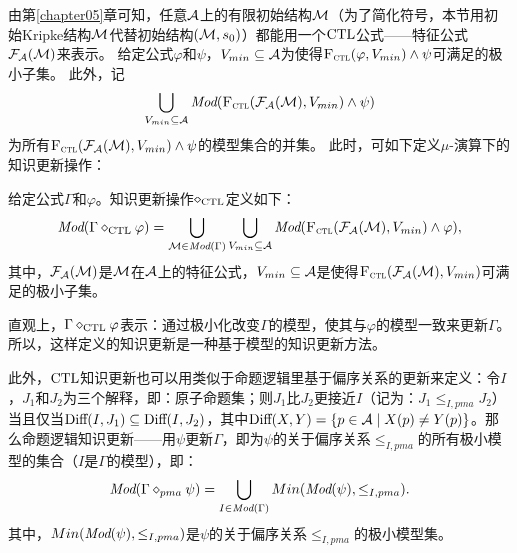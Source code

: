 由第\ref{chapter05}章可知，任意${\cal A}$上的有限初始结构${\cal M}$（为了简化符号，本节用初始Kripke结构${\cal M}$代替初始结构$({\cal M},s_0)$）都能用一个$\textrm{CTL}$公式——特征公式${\cal F}_{{\cal A}}({\cal M})$来表示。%
给定公式$\varphi$和$\psi$，$V_{min}\subseteq {\cal A}$为使得${\textsc{F}_{\textsc{ctl}}}(\varphi, V_{min}) \wedge \psi$可满足的极小子集。
此外，记
$$\bigcup_{V_{min}\subseteq {\cal A}} \textit{Mod}({\textsc{F}_{\textsc{ctl}}}({\cal F}_{{\cal A}}({\cal M}), V_{min}) \wedge \psi)$$ 
为所有${\textsc{F}_{\textsc{ctl}}}({\cal F}_{{\cal A}}({\cal M}), V_{min}) \wedge \psi$的模型集合的并集。
此时，可如下定义$\mu$-演算下的知识更新操作：


\begin{definition}\label{def:KU}
	给定公式$\Gamma$和$\varphi$。知识更新操作$\diamond_{\textrm{CTL}}$定义如下：
	\[
	\textit{Mod}(\Gamma \diamond_{\textrm{CTL}} \varphi) = \bigcup_{{\cal M} \in \textit{Mod}(\Gamma)} \bigcup_{V_{min}\subseteq {\cal A}} \textit{Mod}({\textsc{F}_{\textsc{ctl}}}({\cal F}_{{\cal A}}({\cal M}), V_{min}) \wedge \varphi),
	\]
	其中，${\cal F}_{{\cal A}}({\cal M})$是${\cal M}$在${\cal A}$上的特征公式，$V_{min} \subseteq {\cal A}$是使得${\textsc{F}_{\textsc{ctl}}}({\cal F}_{{\cal A}}({\cal M}), V_{min})$可满足的极小子集。
\end{definition}

直观上，$\Gamma \diamond_{\textrm{CTL}} \varphi$表示：通过极小化改变$\Gamma$的模型，使其与$\varphi$的模型一致来更新$\Gamma$。
所以，这样定义的知识更新是一种基于模型的知识更新方法。

此外，$\textrm{CTL}$知识更新也可以用类似于命题逻辑里基于偏序关系的更新来定义：令$I$，$J_1$和$J_2$为三个解释，即：原子命题集；则$J_1$比$J_2$更接近$I$（记为：$J_1 \leq_{I,pma} J_2$）当且仅当$\textrm{Diff}(I, J_1) \subseteq \textrm{Diff}(I, J_2)$，其中$\textrm{Diff}(X, Y) =\{p\in {\cal A} \mid X(p) \not = Y(p)\}$。那么命题逻辑知识更新——用$\psi$更新$\Gamma$，即为$\psi$的关于偏序关系$\leq_{I,pma}$的所有极小模型的集合（$I$是$\Gamma$的模型），即：
$$\textit{Mod}(\Gamma \diamond_{pma} \psi) = \bigcup_{I \in \textit{Mod}(\Gamma)} Min(\textit{Mod}(\psi), \leq_{I,pma}).$$
其中，$Min(\textit{Mod}(\psi), \leq_{I,pma})$是$\psi$的关于偏序关系$\leq_{I,pma}$的极小模型集。

